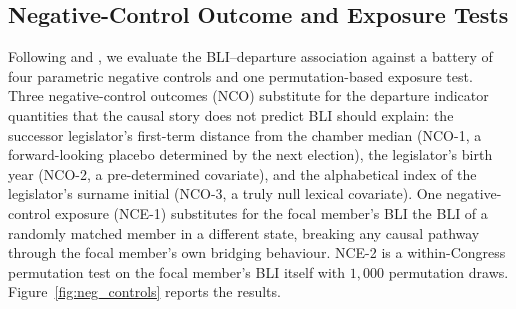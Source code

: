 \documentclass[12pt, a4paper]{article}
\begin{document}
\subsection{Negative-Control Outcome and Exposure Tests}\label{subsec:negative_controls}

Following \citet{lipsitch2010negative} and \citet{eggers2024placebo}, we evaluate the BLI--departure association against a battery of four parametric negative controls and one permutation-based exposure test. Three negative-control outcomes (NCO) substitute for the departure indicator quantities that the causal story does not predict BLI should explain: the successor legislator's first-term distance from the chamber median (NCO-1, a forward-looking placebo determined by the next election), the legislator's birth year (NCO-2, a pre-determined covariate), and the alphabetical index of the legislator's surname initial (NCO-3, a truly null lexical covariate). One negative-control exposure (NCE-1) substitutes for the focal member's BLI the BLI of a randomly matched member in a different state, breaking any causal pathway through the focal member's own bridging behaviour. NCE-2 is a within-Congress permutation test on the focal member's BLI itself with $1{,}000$ permutation draws. Figure~\ref{fig:neg_controls} reports the results.
\end{document}

